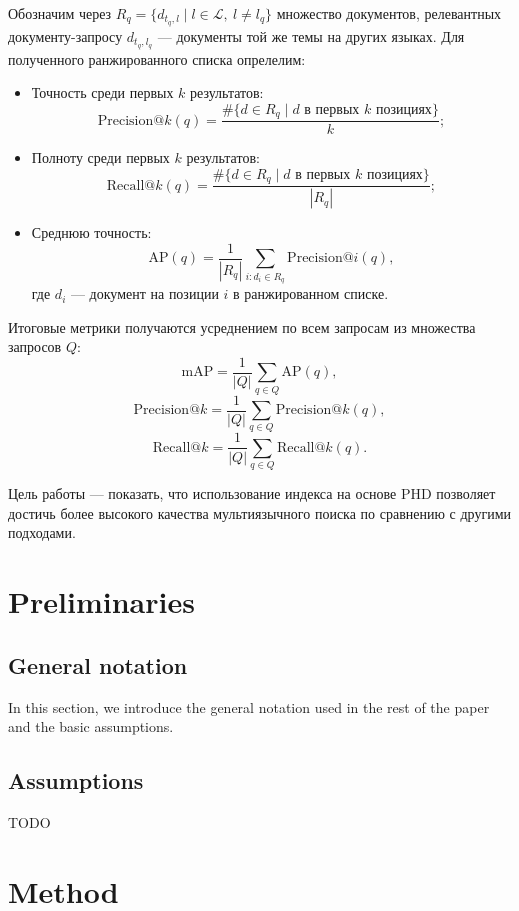 \documentclass{article}
\begin{document}
Обозначим через $R_q = \{ d_{t_q, l} \mid l \in \mathcal{L},\ l \neq l_q \}$ множество документов, релевантных документу-запросу $d_{t_q, l_q}$ --- документы той же темы на других языках. Для полученного ранжированного списка опрелелим:
\begin{itemize}
    \item Точность среди первых $k$ результатов:
    $$\mathrm{Precision@}k(q) = \frac{\#\{ d \in R_q \mid d \text{ в первых } k \text{ позициях} \}}{k};$$
    \item Полноту среди первых $k$ результатов:
    $$\mathrm{Recall@}k(q) = \frac{\#\{ d \in R_q \mid d \text{ в первых } k \text{ позициях} \}}{|R_q|};$$
    \item Среднюю точность:
    $$\mathrm{AP}(q) = \frac{1}{|R_q|} \sum_{i: d_i \in R_q} \mathrm{Precision@}i(q),$$ 
    где $d_i$ — документ на позиции $i$ в ранжированном списке.
\end{itemize}
Итоговые метрики получаются усреднением по всем запросам из множества запросов $Q$:
$$\mathrm{mAP} = \frac{1}{|Q|}\sum_{q\in Q}\mathrm{AP}(q),$$
$$\mathrm{Precision@}k = \frac{1}{|Q|}\sum_{q\in Q}\mathrm{Precision@}k(q),$$
$$\mathrm{Recall@}k = \frac{1}{|Q|}\sum_{q\in Q}\mathrm{Recall@}k(q).$$

Цель работы — показать, что использование индекса на основе PHD позволяет достичь более высокого качества мультиязычного поиска по сравнению с другими подходами.

\section{Preliminaries}\label{sec:prelim}

\subsection{General notation}

In this section, we introduce the general notation used in the rest of the paper and the basic assumptions. 

\subsection{Assumptions} 

TODO

\section{Method}\label{sec:method}
\end{document}

